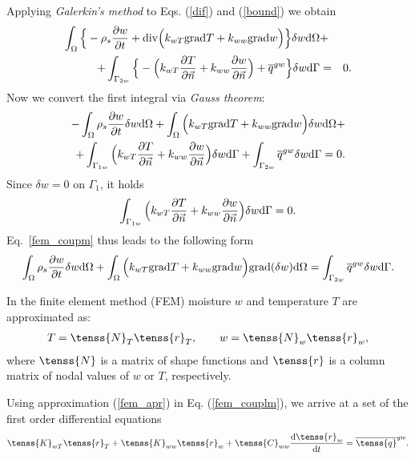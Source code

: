 Applying {\it Galerkin's method} to Eqs. (\ref{dif}) and (\ref{bound}) we obtain
\begin{eqnarray}
\int_{\Omega}\Big\{ -\rho_s\frac{\partial w}{\partial t} + {\rm div} \Big(k_{w T} {\rm grad} T + 
k_{ww} {\rm grad} w\Big)\Big\} \delta w {\rm d} \Omega &+&\nonumber\\ 
+\int_{\Gamma_{2w}}\Big\{ - \Big(k_{w T} \frac{\partial T}{\partial \vec{n}} + 
k_{ww} \frac{\partial w}{\partial \vec{n}}\Big)
+ \overline{q}^{gw}\Big\}\delta w {\rm d} \Gamma &=& 0.
\end{eqnarray}
Now we convert the first integral via {\it Gauss theorem}:
\begin{eqnarray}\label{fem_coupm}
- \int_{\Omega} \rho_s \frac{\partial w}{\partial t} \delta w {\rm d} \Omega + \int_{\Omega} \Big(k_{wT} {\rm grad} T + 
k_{ww} {\rm grad} w\Big) \delta w {\rm d} \Omega + \\
+ \int_{\Gamma_{1w}} \Big(k_{wT} \frac{\partial T}{\partial \vec{n}} + 
k_{ww} \frac{\partial w}{\partial \vec{n}}\Big) \delta w {\rm d} \Gamma
+ \int_{\Gamma_{2w}} \overline{q}^{gw} \delta w {\rm d} \Gamma = 0\nonumber.
\end{eqnarray}
Since $\delta w = 0$ on $\Gamma_1$, it holds
\begin{eqnarray}
\int_{\Gamma_{1w}} \Big(k_{wT} \frac{\partial T}{\partial \vec{n}} + 
k_{ww} \frac{\partial w}{\partial \vec{n}}\Big) \delta w {\rm d} \Gamma = 0.
\end{eqnarray}
Eq.~\eqref{fem_coupm} thus leads to the following form
\begin{eqnarray}\label{fem_couplm}
\int_{\Omega} \rho_s \frac{\partial w}{\partial t} \delta w {\rm d} \Omega + \int_{\Omega} \Big(k_{wT} {\rm grad} T + 
k_{ww} {\rm grad} w\Big) {\rm grad} (\delta w) {\rm d} \Omega
= \int_{\Gamma_{2w}} \overline{q}^{gw} \delta w {\rm d} \Gamma.
\end{eqnarray}

In the finite element method (FEM) moisture $w$ and temperature $T$ are approximated as:
\begin{eqnarray}\label{fem_apr}
T = \tenss{N}_T \tenss{r}_T, \qquad w = \tenss{N}_w \tenss{r}_w,
\end{eqnarray}
where $\tenss{N}$ is a matrix of shape functions and $\tenss{r}$ is a column matrix 
of nodal values of $w$ or $T$, respectively.

Using approximation (\ref{fem_apr}) in Eq. (\ref{fem_couplm}), we arrive at a set of the first 
order differential equations
\begin{eqnarray}\label{fem_couplm_matr}
\tenss{K}_{wT} \tenss{r}_{T} + \tenss{K}_{ww}\tenss{r}_w + \tenss{C}_{ww} \frac{{\rm d}\tenss{r}_w}{{\rm d}t} = 
\overline{\tenss{q}}^{gw}.
\end{eqnarray}\\

